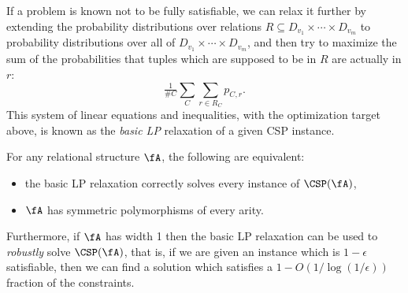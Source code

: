If a problem is known not to be fully satisfiable, we can relax it further by extending the probability distributions over relations $R \subseteq D_{v_1} \times \cdots \times D_{v_m}$ to probability distributions over all of $D_{v_1} \times \cdots \times D_{v_m}$, and then try to maximize the sum of the probabilities that tuples which are supposed to be in $R$ are actually in $r$:
\[
\tfrac{1}{\#C}\sum_C \sum_{r \in R_C} p_{C,r}.
\]
This system of linear equations and inequalities, with the optimization target above, is known as the \emph{basic LP} relaxation of a given CSP instance.

\begin{thm}\label{lp-robust} For any relational structure $\fA$, the following are equivalent:
\begin{itemize}
\item the basic LP relaxation correctly solves every instance of $\CSP(\fA)$,

\item $\fA$ has symmetric polymorphisms of every arity.
\end{itemize}
Furthermore, if $\fA$ has width 1 then the basic LP relaxation can be used to \emph{robustly} solve $\CSP(\fA)$, that is, if we are given an instance which is $1 - \epsilon$ satisfiable, then we can find a solution which satisfies a $1 - O(1/\log(1/\epsilon))$ fraction of the constraints.
\end{thm}
